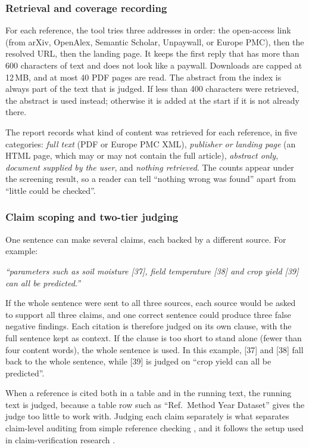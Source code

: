 \documentclass{article}
\begin{document}
\subsubsection{Retrieval and coverage recording}

For each reference, the tool tries three addresses in order: the open-access link (from arXiv, OpenAlex, Semantic Scholar, Unpaywall, or Europe PMC), then the resolved URL, then the landing page. It keeps the first reply that has more than 600 characters of text and does not look like a paywall. Downloads are capped at 12\,MB, and at most 40 PDF pages are read. The abstract from the index is always part of the text that is judged. If less than 400 characters were retrieved, the abstract is used instead; otherwise it is added at the start if it is not already there.

The report records what kind of content was retrieved for each reference, in five categories: \emph{full text} (PDF or Europe PMC XML), \emph{publisher or landing page} (an HTML page, which may or may not contain the full article), \emph{abstract only}, \emph{document supplied by the user}, and \emph{nothing retrieved}. The counts appear under the screening result, so a reader can tell ``nothing wrong was found'' apart from ``little could be checked''.

\subsubsection{Claim scoping and two-tier judging}

One sentence can make several claims, each backed by a different source. For example:

\emph{
``parameters such as soil moisture [37], field temperature [38] and crop yield [39] can all be predicted.''
}

If the whole sentence were sent to all three sources, each source would be asked to support all three claims, and one correct sentence could produce three false negative findings. Each citation is therefore judged on its own clause, with the full sentence kept as context. If the clause is too short to stand alone (fewer than four content words), the whole sentence is used. In this example, [37] and [38] fall back to the whole sentence, while [39] is judged on ``crop yield can all be predicted''.

When a reference is cited both in a table and in the running text, the running text is judged, because a table row such as ``Ref.\ Method Year Dataset'' gives the judge too little to work with. Judging each claim separately is what separates claim-level auditing from simple reference checking \cite{ref2,ref8}, and it follows the setup used in claim-verification research \cite{wadden2020,thorne2018}.
\end{document}
